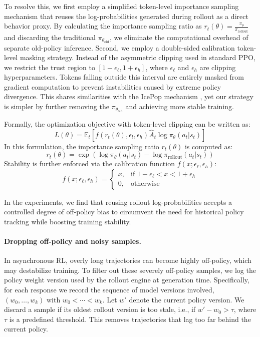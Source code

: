 To resolve this, we first employ a simplified token-level importance sampling mechanism that reuses the log-probabilities generated during rollout as a direct behavior proxy. By calculating the importance sampling ratio as $r_t(\theta) = \frac{\pi_{\theta}}{\pi_{\text{rollout}}}$ and discarding the traditional $\pi_{\theta_{\text{old}}}$, we eliminate the computational overhead of separate old-policy inference. Second, we employ a double-sided calibration token-level masking strategy. Instead of the asymmetric clipping used in standard PPO, we restrict the trust region to $[1-\epsilon_\ell, 1+\epsilon_h]$, where $\epsilon_\ell$ and $\epsilon_h$ are clipping hyperparameters. Tokens falling outside this interval are entirely masked from gradient computation to prevent instabilities caused by extreme policy divergence. This shares similarities with the IcePop mechanism \cite{team2025every}, yet our strategy is simpler by further removing the $\pi_{\theta_{\text{old}}}$ and achieving more stable training. 

Formally, the optimization objective with token-level clipping can be written as:
\begin{equation}
    L(\theta) = \mathbb{E}_t \left[ f(r_t(\theta), \epsilon_l, \epsilon_h) \hat{A}_t \log \pi_{\theta}(a_t|s_t) \right]
\end{equation}
In this formulation, the importance sampling ratio $r_t(\theta)$ is computed as:
\begin{equation}
    r_t(\theta) = \exp\left( \log \pi_\theta(a_t|s_t) - \log \pi_{\text{rollout}}(a_t|s_t) \right)
\end{equation}
Stability is further enforced via the calibration function $f(x; \epsilon_\ell, \epsilon_h)$:
\begin{equation}
    f(x; \epsilon_\ell, \epsilon_h) = 
    \begin{cases} 
    x, & \text{if } 1-\epsilon_\ell < x < 1+\epsilon_h \\
    0, & \text{otherwise}
    \end{cases}
\end{equation}

In the experiments, we find that reusing rollout log-probabilities accepts a controlled degree of off-policy bias to circumvent the need for historical policy tracking while boosting training stability.


\paragraph{Dropping off-policy and noisy samples.}
In asynchronous RL, overly long trajectories can become highly off-policy, which may destabilize training. To filter out these severely off-policy samples, we log the policy weight version used by the rollout engine at generation time. Specifically, for each response we record the sequence of model versions involved, $(w_0, \ldots, w_k)$ with $w_0 < \cdots < w_k$. Let $w'$ denote the current policy version. We discard a sample if its oldest rollout version is too stale, i.e., if $w' - w_0 > \tau$, where $\tau$ is a predefined threshold. This removes trajectories that lag too far behind the current policy.

